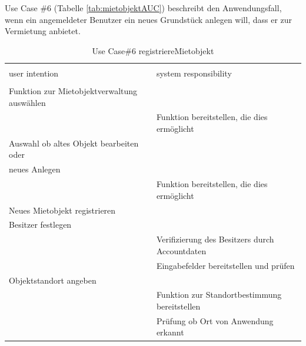 \newpage
Use Case \#6 (Tabelle \ref{tab:mietobjektAUC}) beschreibt den Anwendungsfall, wenn ein angemeldeter Benutzer ein neues Grundstück anlegen will, dass er zur Vermietung anbietet.

\begin{table}[H]
\caption{Use Case\#6 registriereMietobjekt }
\centering
\begin{tabular}{l l}
\\ [-0.5ex]

\hline\hline
\\ [-0.5ex]
user intention & system responsibility
\\ [1.5ex]
\hline
\\ [-0.5ex]
Funktion zur Mietobjektverwaltung auswählen      &                                   \\[1ex]
                                        & Funktion bereitstellen, die dies ermöglicht   \\[1ex]
Auswahl ob altes Objekt bearbeiten oder      &                                   \\[1ex]
neues Anlegen                                 &                                   \\[1ex]
                                               & Funktion bereitstellen, die dies ermöglicht   \\[1ex]
Neues Mietobjekt registrieren                    &                                   \\[1ex] 
Besitzer festlegen                          &                                   \\[1ex] 
                                           & Verifizierung des Besitzers durch Accountdaten \\[1ex]
                                          & Eingabefelder bereitstellen und prüfen     \\[1ex]
Objektstandort angeben                  &                                   \\[1ex]
                                              & Funktion zur Standortbestimmung bereitstellen  \\[1ex] 
                                          &  Prüfung ob Ort von Anwendung erkannt             \\[1ex]   


\end{tabular}
\end{table}
